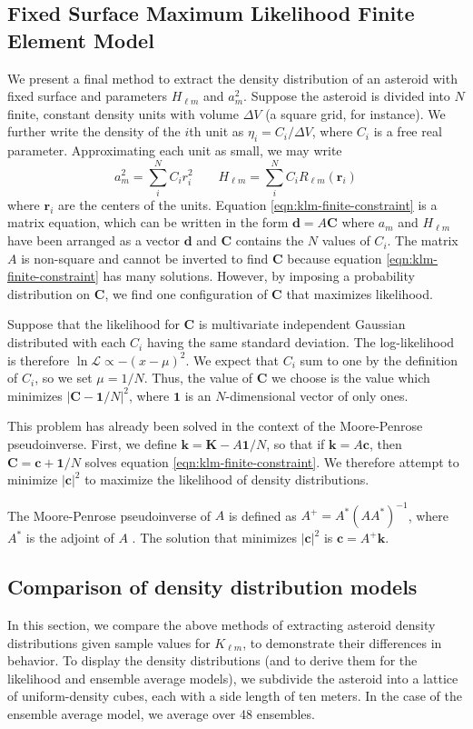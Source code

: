 \documentclass{aastex631}
\begin{document}
\subsection{Fixed Surface Maximum Likelihood Finite Element Model}
\label{sec:like-density}
We present a final method to extract the density distribution of an asteroid with fixed surface and parameters $H_{\ell m}$ and $a_m^2$. Suppose the asteroid is divided into $N$ finite, constant density units with volume $\Delta V$ (a square grid, for instance). We further write the density of the $i$th unit as $\eta_i = C_i / \Delta V$, where $C_i$ is a free real parameter. Approximating each unit as small, we may write 
\begin{equation}
  a_m^2 = \sum_i^N C_i r_i^2 \qquad H_{\ell m} = \sum_i^N C_i R_{\ell m}(\bm r_i)
  \label{eqn:klm-finite-constraint}
\end{equation}
where $\bm r_i$ are the centers of the units. Equation \ref{eqn:klm-finite-constraint} is a matrix equation, which can be written in the form $\bm d = A \bm C$ where $a_m$ and $H_{\ell m}$ have been arranged as a vector $\bm d$ and $\bm C$ contains the $N$ values of $C_i$. The matrix $A$ is non-square and cannot be inverted to find $\bm C$ because equation \ref{eqn:klm-finite-constraint} has many solutions. However, by imposing a probability distribution on $\bm C$, we find one configuration of $\bm C$ that maximizes likelihood.

Suppose that the likelihood for $\bm C$ is multivariate independent Gaussian distributed with each $C_i$ having the same standard deviation. The log-likelihood is therefore $\ln \mathcal{L} \propto -(x - \mu)^2$. We expect that $C_{i}$ sum to one by the definition of $C_i$, so we set $\mu = 1/N$. Thus, the value of $\bm C$ we choose is the value which minimizes $|\bm C - \bm 1 /N|^2$, where $\bm 1$ is an $N$-dimensional vector of only ones.

This problem has already been solved in the context of the Moore-Penrose pseudoinverse. First, we define $\bm k = \bm K - A\bm 1/N$, so that if $\bm k = A \bm c$, then $\bm C = \bm c + \bm 1/N$ solves equation \ref{eqn:klm-finite-constraint}. We therefore attempt to minimize $|\bm c|^2$ to maximize the likelihood of density distributions.

The Moore-Penrose pseudoinverse of $A$ is defined as $A^+ = A^* (AA^*)^{-1}$, where $A^*$ is the adjoint of $A$ \cite{Barata2012}. The solution that minimizes $|\bm c|^2$ is $\bm c = A^+\bm k$. 


\subsection{Comparison of density distribution models}
\label{sec:density-results}
In this section, we compare the above methods of extracting asteroid density distributions given sample values for $K_{\ell m}$, to demonstrate their differences in behavior. To display the density distributions (and to derive them for the likelihood and ensemble average models), we subdivide the asteroid into a lattice of uniform-density cubes, each with a side length of ten meters. In the case of the ensemble average model, we average over 48 ensembles.
\end{document}
